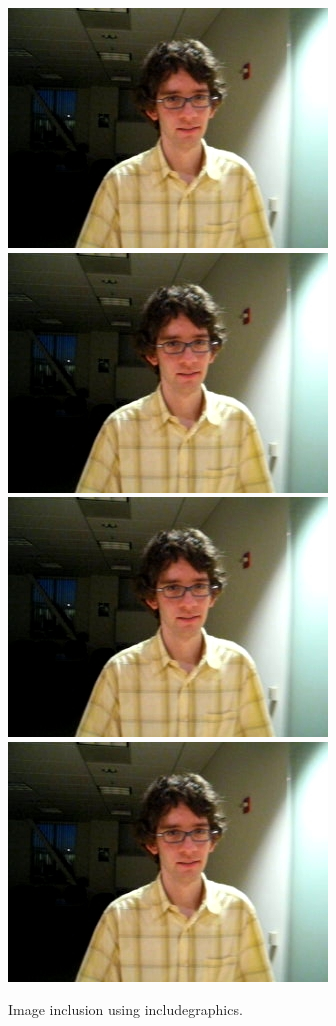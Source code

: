 \documentclass{article}
\newlength{\mylength}
\begin{document}
\begin{figure}
    \centering
    \includegraphics[width=\mylength]{david}%
    \includegraphics[width=\mylength]{david}\\
    \includegraphics[width=\mylength]{david}%
    \includegraphics[width=\mylength]{david}\\
    \caption{Image inclusion using includegraphics.}
\end{figure}
\end{document}
